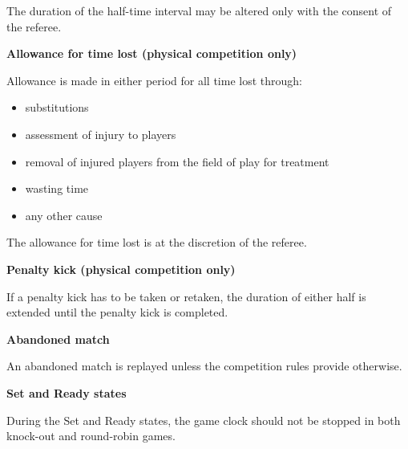 The duration of the half-time interval may be altered only with the consent of the referee.

\bigskip

{\bfseries Allowance for time lost (physical competition only)}

\headlinebox

Allowance is made in either period for all time lost through:

\begin{itemize}
\item substitutions
\item assessment of injury to players
\item removal of injured players from the field of play for treatment
\item wasting time
\item any other cause
\end{itemize}

The allowance for time lost is at the discretion of the referee.

\bigskip

{\bfseries Penalty kick (physical competition only)}

\headlinebox

If a penalty kick has to be taken or retaken, the duration of either half is extended until the penalty kick is completed.

\bigskip

{\sffamily
\textbf{Abandoned match} }

\headlinebox

An abandoned match is replayed unless the competition rules provide otherwise.

\bigskip


{\bfseries Set and Ready states}

\headlinebox

During the Set and Ready states, the game clock should not be stopped in both knock-out and round-robin games.
